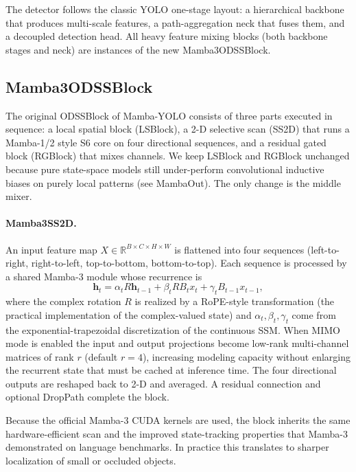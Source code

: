 \documentclass[10pt,twocolumn,letterpaper]{article}
\begin{document}
The detector follows the classic YOLO one-stage layout: a hierarchical backbone that produces multi-scale features, a path-aggregation neck that fuses them, and a decoupled detection head. All heavy feature mixing blocks (both backbone stages and neck) are instances of the new Mamba3ODSSBlock.

\subsection{Mamba3ODSSBlock}
The original ODSSBlock of Mamba-YOLO consists of three parts executed in sequence: a local spatial block (LSBlock), a 2-D selective scan (SS2D) that runs a Mamba-1/2 style S6 core on four directional sequences, and a residual gated block (RGBlock) that mixes channels. We keep LSBlock and RGBlock unchanged because pure state-space models still under-perform convolutional inductive biases on purely local patterns (see MambaOut). The only change is the middle mixer.

\paragraph{Mamba3SS2D.}
An input feature map \(X \in \mathbb{R}^{B \times C \times H \times W}\) is flattened into four sequences (left-to-right, right-to-left, top-to-bottom, bottom-to-top). Each sequence is processed by a shared Mamba-3 module whose recurrence is
\begin{equation}
\mathbf{h}_t = \alpha_t R \mathbf{h}_{t-1} + \beta_t R B_t x_t + \gamma_t B_{t-1} x_{t-1},
\end{equation}
where the complex rotation \(R\) is realized by a RoPE-style transformation (the practical implementation of the complex-valued state) and \(\alpha_t, \beta_t, \gamma_t\) come from the exponential-trapezoidal discretization of the continuous SSM. When MIMO mode is enabled the input and output projections become low-rank multi-channel matrices of rank \(r\) (default \(r=4\)), increasing modeling capacity without enlarging the recurrent state that must be cached at inference time. The four directional outputs are reshaped back to 2-D and averaged. A residual connection and optional DropPath complete the block.

Because the official Mamba-3 CUDA kernels are used, the block inherits the same hardware-efficient scan and the improved state-tracking properties that Mamba-3 demonstrated on language benchmarks. In practice this translates to sharper localization of small or occluded objects.
\end{document}
